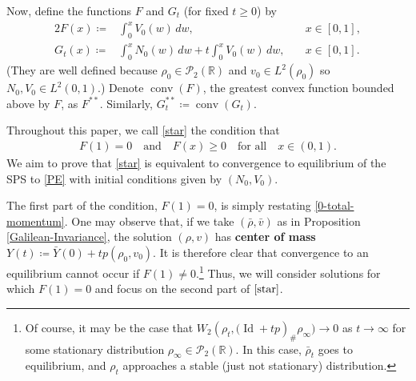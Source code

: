 \documentclass[11pt]{article}
\numberwithin{equation}{section}
\DeclareMathOperator{\Id}{Id}
\DeclareMathOperator{\conv}{conv}
\begin{document}
    Now, define the functions $F$ and $G_t$ (for fixed $t\geq0$) by 
    \begin{alignat}{2}\label{F-def}
        F(x)\coloneq&\int_0^xV_0(w) \, dw, \quad &x\in[0,1],
        \\
        \label{G-def}
        G_t(x)\coloneq&\int_0^x N_0(w) \, dw+t\int_0^xV_0(w) \, dw, \quad &x\in[0,1].
    \end{alignat}
    (They are well defined because $\rho_0\in\mathcal{P}_2(\mathbb{R})$ and $v_0\in L^2(\rho_0)$ so $N_0,V_0\in L^2(0,1)$.) Denote $\conv(F)$, the greatest convex function bounded above by $F$, as $F^{**}$. Similarly, $G_t^{**}\coloneq \conv(G_t)$.

    Throughout this paper, we call \eqref{star} the condition that 
    \begin{align}\label{star}\tag{$\bigstar$}
        F(1)=0 \quad\text{and}\quad F(x)\geq0 \quad\text{for all}\quad x\in(0, 1). 
    \end{align}
    We aim to prove that \eqref{star} is equivalent to convergence to equilibrium of the SPS to \eqref{PE} with initial conditions given by $(N_0, V_0)$.

    The first part of the condition, $F(1)=0$, is simply restating \eqref{0-total-momentum}. One may observe that, if we take $(\bar{\rho},\bar{v})$ as in Proposition \ref{Galilean-Invariance}, the solution $(\rho,v)$ has \textbf{center of mass} $Y(t)\coloneq\bar{Y}(0)+tp(\rho_0,v_0)$. It is therefore clear that convergence to an equilibrium cannot occur if $F(1)\neq0$.\footnote{Of course, it may be the case that $W_2(\rho_t,\big(\Id+tp)_\#\rho_\infty\big)\to0$ as $t\to\infty$ for some stationary distribution $\rho_\infty\in\mathcal{P}_2(\mathbb{R})$. In this case, $\bar{\rho}_t$ goes to equilibrium, and $\rho_t$ approaches a stable (just not stationary) distribution.} Thus, we will consider solutions for which $F(1)=0$ and focus on the second part of $\eqref{star}$.
\end{document}
